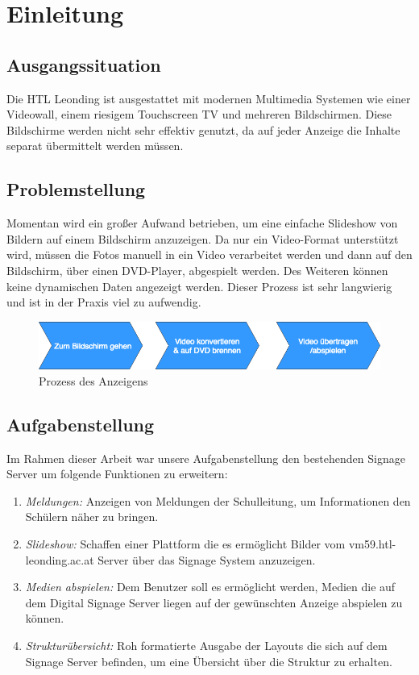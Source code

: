 \chapter{Einleitung}
\section{Ausgangssituation}
Die HTL Leonding ist ausgestattet mit modernen Multimedia Systemen wie einer Videowall, einem riesigem Touchscreen TV und mehreren Bildschirmen. Diese Bildschirme werden nicht sehr effektiv genutzt, da auf jeder Anzeige die Inhalte separat übermittelt werden müssen. 

\section{Problemstellung}
Momentan wird ein großer Aufwand betrieben, um eine einfache Slideshow von Bildern auf einem Bildschirm anzuzeigen. Da nur ein Video-Format unterstützt wird, müssen die Fotos manuell in ein Video verarbeitet werden und dann auf den Bildschirm, über einen DVD-Player, abgespielt werden. Des Weiteren können keine dynamischen Daten angezeigt werden. Dieser Prozess ist sehr langwierig und ist in der Praxis viel zu aufwendig.

\begin{figure}[h]
\centering
\includegraphics[width=1\textwidth]{images/01_Introduction/WayToDisplay.png}
\caption{Prozess des Anzeigens}
\label{img:processofshow}
\end{figure}

\section{Aufgabenstellung}
Im Rahmen dieser Arbeit war unsere Aufgabenstellung den bestehenden Signage Server um folgende Funktionen zu erweitern:

\begin{enumerate}
	\item {\em Meldungen:} Anzeigen von Meldungen der Schulleitung, um Informationen den Schülern näher zu bringen. 
	\item {\em Slideshow:} Schaffen einer Plattform die es ermöglicht Bilder vom vm59.htl-leonding.ac.at Server über das Signage System anzuzeigen.
	\item {\em Medien abspielen:} Dem Benutzer soll es ermöglicht werden, Medien die auf dem Digital Signage Server liegen auf der gewünschten Anzeige abspielen zu können.
	\item {\em Strukturübersicht:} Roh formatierte Ausgabe der Layouts die sich auf dem Signage Server befinden, um eine Übersicht über die Struktur zu erhalten.	
\end{enumerate}

